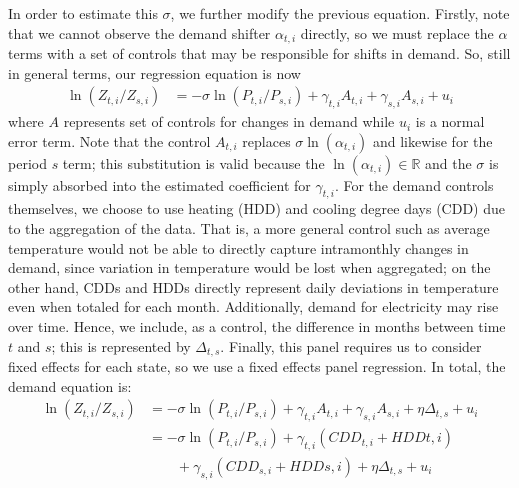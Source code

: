 \documentclass[11pt,a4paper]{extarticle}
\begin{document}
In order to estimate this $\sigma$, we further modify the previous equation. 
Firstly, note that we cannot observe the demand shifter $\alpha_{t,i}$ directly, so we must replace the $\alpha$ terms with a set of controls that may be responsible for shifts in demand. So, still in general terms, our regression equation is now
\begin{align*}
\ln (Z_{t, i} / Z_{ s, i}) &= -\sigma \ln (P_{t,i} / P_{s,i}) +  \gamma_{t,i} A_{t,i} + \gamma_{s,i} A_{s,i} + u_i
\end{align*}
where $A$ represents set of controls for changes in demand while $u_i$ is a normal error term. Note that the control  $A_{t,i}$ replaces $\sigma \ln(\alpha_{t,i})$ and likewise for the period $s$ term; this substitution is valid because the $\ln(\alpha_{t,i}) \in \mathbb{R}$ and the $\sigma$ is simply absorbed into the estimated coefficient for $\gamma_{t,i}$. For the demand controls themselves, we choose to use heating (HDD) and cooling degree days (CDD) due to the aggregation of the data. That is, a more general control such as average temperature would not be able to directly capture intramonthly changes in demand, since variation in temperature would be lost when aggregated; on the other hand, CDDs and HDDs directly represent daily deviations in temperature even when totaled for each month. Additionally, demand for electricity may rise over time. Hence, we include, as a control, the difference in months between time $t$ and $s$; this is represented by $\Delta_{t,s}$. Finally, this panel requires us to consider fixed effects for each state, so we use a fixed effects panel regression. In total, the demand equation is:
\begin{align*}
\ln (Z_{ t, i} / Z_{ s, i}) &= -\sigma \ln (P_{t,i} / P_{s,i}) +  \gamma_{t,i} A_{t,i} + \gamma_{s,i} A_{s,i} + \eta \Delta_{t,s} + u_i \\
&= -\sigma \ln (P_{t,i} / P_{s,i}) +  \gamma_{t,i} \left( CDD_{t,i} + HDD{t,i} \right) \\
&\qquad + \gamma_{s,i} \left( CDD_{s,i} + HDD{s,i} \right)  + \eta \Delta_{t,s} + u_i
\end{align*}
\end{document}
